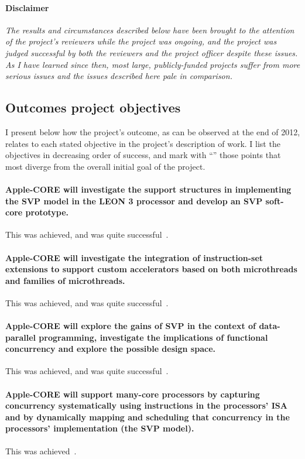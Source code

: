 \paragraph{Disclaimer}
{\itshape The results and circumstances described below have been
brought to the attention of the project's reviewers while
the project was ongoing, and the project was judged successful
by both the reviewers and the project officer \emph{despite} these
issues. As I have learned since then, most
large, publicly-funded projects suffer from more serious issues and
the issues described here pale in comparison.}

\subsection{Outcomes \vs project objectives}

I present below how the project's outcome, as can be observed at the
end of 2012, relates to each stated objective in the project's
description of work. I list the objectives in decreasing order of
success, and mark with ``'' those
points that most diverge from the overall initial goal of the project.

\paragraph{Apple-CORE will investigate the support structures in 
implementing the SVP model in the LEON 3 processor and develop an SVP soft-core prototype.}
This was achieved, and was quite successful~\cite{danek.10.ddecs,sykora.11.lncs,danek.12}.

\paragraph{Apple-CORE will investigate the integration of instruction-set extensions to support custom accelerators based on both microthreads and families of microthreads.}
This was achieved, and was quite successful~\cite{danek.12}.

\paragraph{Apple-CORE will explore the gains of SVP in the context of data-parallel 
programming, investigate the implications of functional concurrency and explore the possible design space.}
This was achieved, and was quite successful~\cite{a-c-d44}.

\paragraph{Apple-CORE will support many-core processors by 
capturing concurrency systematically using 
instructions in the processors’ ISA and by dynamically mapping 
and scheduling that concurrency in the processors’ implementation (the SVP model).}
This was achieved~\cite{poss.12.dsd}.

